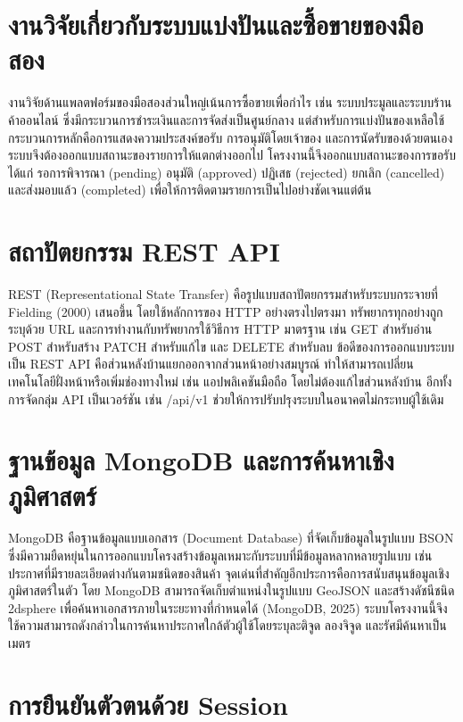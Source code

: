 \documentclass[12pt,a4paper]{report}
\begin{document}
\section{งานวิจัยเกี่ยวกับระบบแบ่งปันและซื้อขายของมือสอง}

งานวิจัยด้านแพลตฟอร์มของมือสองส่วนใหญ่เน้นการซื้อขายเพื่อกำไร เช่น ระบบประมูลและระบบร้านค้าออนไลน์ ซึ่งมีกระบวนการชำระเงินและการจัดส่งเป็นศูนย์กลาง แต่สำหรับการแบ่งปันของเหลือใช้ กระบวนการหลักคือการแสดงความประสงค์ขอรับ การอนุมัติโดยเจ้าของ และการนัดรับของด้วยตนเอง ระบบจึงต้องออกแบบสถานะของรายการให้แตกต่างออกไป โครงงานนี้จึงออกแบบสถานะของการขอรับ ได้แก่ รอการพิจารณา (pending) อนุมัติ (approved) ปฏิเสธ (rejected) ยกเลิก (cancelled) และส่งมอบแล้ว (completed) เพื่อให้การติดตามรายการเป็นไปอย่างชัดเจนแต่ต้น

\section{สถาปัตยกรรม REST API}

REST (Representational State Transfer) คือรูปแบบสถาปัตยกรรมสำหรับระบบกระจายที่ Fielding (2000) เสนอขึ้น โดยใช้หลักการของ HTTP อย่างตรงไปตรงมา ทรัพยากรทุกอย่างถูกระบุด้วย URL และการทำงานกับทรัพยากรใช้วิธีการ HTTP มาตรฐาน เช่น GET สำหรับอ่าน POST สำหรับสร้าง PATCH สำหรับแก้ไข และ DELETE สำหรับลบ ข้อดีของการออกแบบระบบเป็น REST API คือส่วนหลังบ้านแยกออกจากส่วนหน้าอย่างสมบูรณ์ ทำให้สามารถเปลี่ยนเทคโนโลยีฝั่งหน้าหรือเพิ่มช่องทางใหม่ เช่น แอปพลิเคชันมือถือ โดยไม่ต้องแก้ไขส่วนหลังบ้าน อีกทั้งการจัดกลุ่ม API เป็นเวอร์ชัน เช่น /api/v1 ช่วยให้การปรับปรุงระบบในอนาคตไม่กระทบผู้ใช้เดิม

\section{ฐานข้อมูล MongoDB และการค้นหาเชิงภูมิศาสตร์}

MongoDB คือฐานข้อมูลแบบเอกสาร (Document Database) ที่จัดเก็บข้อมูลในรูปแบบ BSON ซึ่งมีความยืดหยุ่นในการออกแบบโครงสร้างข้อมูลเหมาะกับระบบที่มีข้อมูลหลากหลายรูปแบบ เช่น ประกาศที่มีรายละเอียดต่างกันตามชนิดของสินค้า จุดเด่นที่สำคัญอีกประการคือการสนับสนุนข้อมูลเชิงภูมิศาสตร์ในตัว โดย MongoDB สามารถจัดเก็บตำแหน่งในรูปแบบ GeoJSON และสร้างดัชนีชนิด 2dsphere เพื่อค้นหาเอกสารภายในระยะทางที่กำหนดได้ (MongoDB, 2025) ระบบโครงงานนี้จึงใช้ความสามารถดังกล่าวในการค้นหาประกาศใกล้ตัวผู้ใช้โดยระบุละติจูด ลองจิจูด และรัศมีค้นหาเป็นเมตร

\section{การยืนยันตัวตนด้วย Session}
\end{document}
